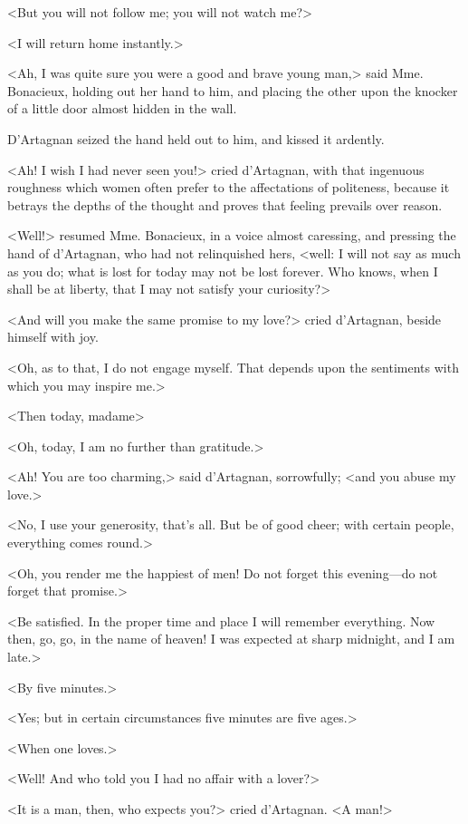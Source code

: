 <But you will not follow me; you will not watch me?> 

<I will return home instantly.> 

<Ah, I was quite sure you were a good and brave young man,> said Mme. Bonacieux, holding out her hand to him, and placing the other upon the knocker of a little door almost hidden in the wall. 

D'Artagnan seized the hand held out to him, and kissed it ardently. 

<Ah! I wish I had never seen you!> cried d'Artagnan, with that ingenuous roughness which women often prefer to the affectations of politeness, because it betrays the depths of the thought and proves that feeling prevails over reason. 

<Well!> resumed Mme. Bonacieux, in a voice almost caressing, and pressing the hand of d'Artagnan, who had not relinquished hers, <well: I will not say as much as you do; what is lost for today may not be lost forever. Who knows, when I shall be at liberty, that I may not satisfy your curiosity?> 

<And will you make the same promise to my love?> cried d'Artagnan, beside himself with joy. 

<Oh, as to that, I do not engage myself. That depends upon the sentiments with which you may inspire me.> 

<Then today, madame\longdash> 

<Oh, today, I am no further than gratitude.> 

<Ah! You are too charming,> said d'Artagnan, sorrowfully; <and you abuse my love.> 

<No, I use your generosity, that's all. But be of good cheer; with certain people, everything comes round.> 

<Oh, you render me the happiest of men! Do not forget this evening---do not forget that promise.> 

<Be satisfied. In the proper time and place I will remember everything. Now then, go, go, in the name of heaven! I was expected at sharp midnight, and I am late.> 

<By five minutes.> 

<Yes; but in certain circumstances five minutes are five ages.> 

<When one loves.> 

<Well! And who told you I had no affair with a lover?> 

<It is a man, then, who expects you?> cried d'Artagnan. <A man!> 

